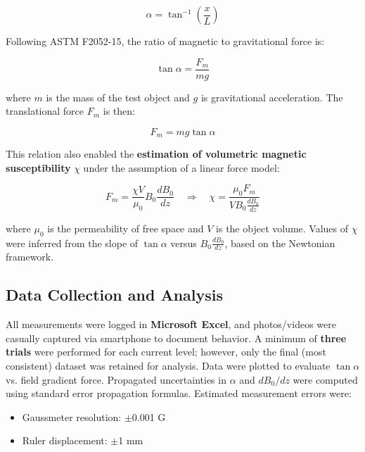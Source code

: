 \begin{equation}
	\alpha = \tan^{-1}\left(\frac{x}{L}\right)
\end{equation}

Following ASTM F2052-15, the ratio of magnetic to gravitational force is:

\begin{equation}
	\tan \alpha = \frac{F_m}{mg}
\end{equation}

where $m$ is the mass of the test object and $g$ is gravitational acceleration. The translational force $F_m$ is then:

\begin{equation}
	F_m = mg \tan \alpha
\end{equation}

This relation also enabled the \textbf{estimation of volumetric magnetic susceptibility} $\chi$ under the assumption of a linear force model:

\begin{equation}
	F_m = \frac{\chi V}{\mu_0} B_0 \frac{dB_0}{dz}
	\quad \Rightarrow \quad
	\chi = \frac{\mu_0 F_m}{V B_0 \frac{dB_0}{dz}}
\end{equation}

where $\mu_0$ is the permeability of free space and $V$ is the object volume. Values of $\chi$ were inferred from the slope of $\tan \alpha$ versus $B_0 \frac{dB_0}{dz}$, based on the Newtonian framework.

\subsection*{Data Collection and Analysis}

All measurements were logged in \textbf{Microsoft Excel}, and photos/videos were casually captured via smartphone to document behavior. A minimum of \textbf{three trials} were performed for each current level; however, only the final (most consistent) dataset was retained for analysis. Data were plotted to evaluate $\tan \alpha$ vs. field gradient force. Propagated uncertainties in $\alpha$ and $dB_0/dz$ were computed using standard error propagation formulas. Estimated measurement errors were:

\begin{itemize}
	\item Gaussmeter resolution: $\pm$0.001 G  
	\item Ruler displacement: $\pm$1 mm  
\end{itemize}

